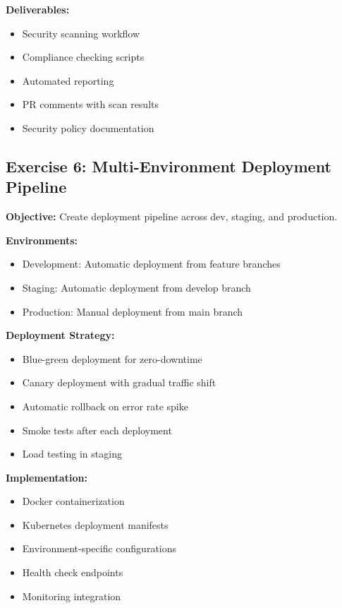 \textbf{Deliverables:}
\begin{itemize}
    \item Security scanning workflow
    \item Compliance checking scripts
    \item Automated reporting
    \item PR comments with scan results
    \item Security policy documentation
\end{itemize}

\subsection{Exercise 6: Multi-Environment Deployment Pipeline}

\textbf{Objective:} Create deployment pipeline across dev, staging, and production.

\textbf{Environments:}
\begin{itemize}
    \item Development: Automatic deployment from feature branches
    \item Staging: Automatic deployment from develop branch
    \item Production: Manual deployment from main branch
\end{itemize}

\textbf{Deployment Strategy:}
\begin{itemize}
    \item Blue-green deployment for zero-downtime
    \item Canary deployment with gradual traffic shift
    \item Automatic rollback on error rate spike
    \item Smoke tests after each deployment
    \item Load testing in staging
\end{itemize}

\textbf{Implementation:}
\begin{itemize}
    \item Docker containerization
    \item Kubernetes deployment manifests
    \item Environment-specific configurations
    \item Health check endpoints
    \item Monitoring integration
\end{itemize}

